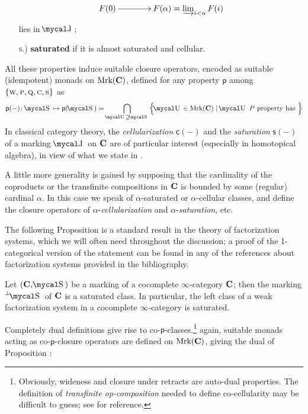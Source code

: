 \begin{definition}
\begin{itemize}
\[
\xymatrix@C=1mm{
F(0) \ar[r] & **[r] F(\alpha) = \varinjlim_{i<\alpha}F(i)
}
\]
lies in $\mcal{J}$;
\item[\textsc{s}.)] \textbf{saturated} if it is almost saturated and cellular.
\end{itemize} 
All these properties induce suitable closure operators, encoded as suitable (idempotent) monads on $\text{Mrk}(\textbf{C})$, defined for any property $\textsf{p}$ among $\{ \textsc{w}, \textsc{p}, \textsc{q}, \textsc{c}, \textsc{s} \}$ as 
\[
\textsf{p}(-) \colon 
\mS \mapsto \textsf{p}(\mS) = \bigcap_{\mcal{U}\supseteq \mS}\Big\{ \mcal{U}\in \mrk(\CC)\mid \mcal{U} \text{ $P$ property has } \Big\}\]
In classical category theory, the \emph{cellularization} $\textsf{c}(-)$ and the \emph{saturation} $\textsf{s}(-)$ of a marking $\mcal{J}$ on $\textbf{C}$ are of particular interest (especially in homotopical algebra), in view of what we state in \aprop {}.
\begin{remark}
A little more generality is gained by supposing that the cardinality of the coproducts or the transfinite compositions in $\textbf{C}$ is bounded by some (regular) cardinal $\alpha$. In this case we speak of $\alpha$\hyp{}saturated or $\alpha$\hyp{}cellular classes, and define the closure operators of $\alpha$\hyp{}\emph{cellularization} and $\alpha$\hyp{}\emph{saturation}, etc.
\end{remark}
\end{definition}
The following Proposition is a standard result in the theory of factorization systems, which we will often need throughout the discussion; a proof of the 1\hyp{}categorical version of the statement can be found in any of the references about factorization systems provided in the bibliography.
\begin{proposition}\label{satu}
Let $(\CC,\mS)$ be a marking of a cocomplete $\infty$\hyp{}category $\textbf{C}$; then the marking $\prescript{\perp}{}{\mS}$ of $\textbf{C}$ is a saturated class. In particular, the left class of a weak factorization system in a cocomplete $\infty$\hyp{}category is saturated.
\end{proposition}
Completely dual definitions give rise to co\hyp{}$\textsf{p}$\hyp{}classes.\footnote{Obviously, wideness and closure under retracts are auto\hyp{}dual properties. The definition of \emph{transfinite op\hyp{}composition} needed to define co\hyp{}cellularity may be difficult to guess; see \cite{Joy} for reference.} again, suitable monads acting as co\hyp{}$\textsf{p}$\hyp{}closure operators are defined on $\text{Mrk}(\textbf{C})$, giving the dual of Proposition :
